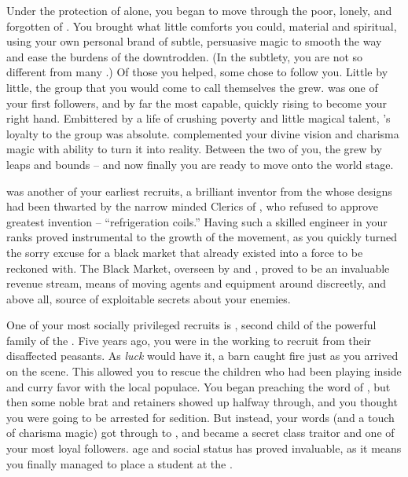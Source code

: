 \documentclass[char]{GL2020}
\begin{document}
Under the protection of \cGenesis{} alone, you began to move through the poor, lonely, and forgotten of \pEarth{}. You brought what little comforts you could, material and spiritual, using your own personal brand of subtle, persuasive magic to smooth the way and ease the burdens of the downtrodden. (In the subtlety, you are not so different from many \pShippies{}.) Of those you helped, some chose to follow you. Little by little, the group that you would come to call themselves the \pGoaties{} grew. \cChupSecond{\full} was one of your first followers, and by far the most capable, quickly rising to become your right hand. Embittered by a life of crushing poverty and little magical talent, \cChupSecond{}'s loyalty to the group was absolute. \cChupSecond{\They} complemented your divine vision and charisma magic with \cChupSecond{\their} ability to turn it into reality. Between the two of you, the \pGoaties{} grew by leaps and bounds -- and now finally you are ready to move onto the world stage.

\cChupInventor{\full} was another of your earliest recruits, a brilliant inventor from the \pTech{} whose designs had been thwarted by the narrow minded Clerics of \cTechGod{}, who refused to approve \cChupSecond{\their} greatest invention – ``refrigeration coils.'' Having such a skilled engineer in your ranks proved instrumental to the growth of the movement, as you quickly turned the sorry excuse for a black market that already existed into a force to be reckoned with. The Black Market, overseen by \cChupSecond{} and \cChupInventor{}, proved to be an invaluable revenue stream, means of moving agents and equipment around discreetly, and above all, source of exploitable secrets about your enemies. 

One of your most socially privileged recruits is \cChupStudent{\full}, second child of the powerful \cChupStudent{\formal} family of the \pFarm{}. Five years ago, you were in the \pFarm{} working to recruit from their disaffected peasants. As \emph{luck} would have it, a barn caught fire just as you arrived on the scene. This allowed you to rescue the children who had been playing inside and curry favor with the local populace. You began preaching the word of \cGenesis{}, but then some noble brat and \cChupStudent{\their} retainers showed up halfway through, and you thought you were going to be arrested for sedition. But instead, your words (and a touch of charisma magic) got through to \cChupStudent{}, and \cChupStudent{\they} became a secret class traitor and one of your most loyal followers. \cChupStudent{\Their} age and social status has proved invaluable, as it means you finally managed to place a student at the \pSchool{}.
\end{document}
